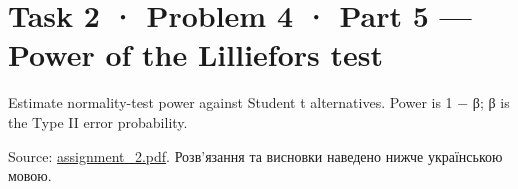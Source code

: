 \documentclass[11pt]{article}
\title{}
\begin{document}
    
    \maketitle
    
    

    
    \section{Task 2 · Problem 4 · Part 5 --- Power of the Lilliefors
test}\label{task-2-problem-4-part-5-power-of-the-lilliefors-test}

Estimate normality-test power against Student t alternatives. Power is 1
− β; β is the Type II error probability.

Source: \href{../../../input/assignment_2.pdf}{assignment\_2.pdf}. Розв'язання
та висновки наведено нижче українською мовою.
\end{document}
